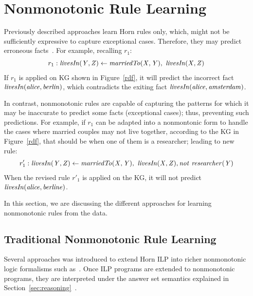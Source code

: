 \section{Nonmonotonic Rule Learning}\label{sec:nmrulelearn}

Previously described approaches learn Horn rules only, which, might not be sufficiently expressive to capture
exceptional cases. Therefore, they may predict erroneous facts~\cite{rumis}. For example, recalling $r_1$:
\[r_1 : \mathit{livesIn(Y,Z)} \leftarrow \mathit{marriedTo(X,Y)},\ \mathit{livesIn(X,Z)} \]
If $r_1$ is applied on KG shown in Figure~\ref{rdf}, it will predict the incorrect fact $\mathit{livesIn(alice,berlin)}$, which contradicts the exiting fact $\mathit{livesIn(alice, amsterdam)}$. 

In contrast, nonmonotonic rules are capable of capturing the patterns for which it may be inaccurate to predict some facts (\ie exceptional cases); thus, preventing such predictions. For example, if $r_1$ can be adapted into a nonmontonic form to handle the cases where married couples may not live together, according to the KG in Figure~\ref{rdf}, that should be when one of them is a researcher; leading to new rule:
\[r'_1 : \mathit{livesIn(Y,Z)} \leftarrow \mathit{marriedTo(X,Y)},\ \mathit{livesIn(X,Z)}, \mathit{not}~ \mathit{researcher(Y)}\]
When the revised rule $r'_1$ is applied on the KG, it will not predict $\mathit{livesIn(alice,berline)}$. 

In this section, we are discussing the different approaches for learning nonmonotonic rules from the data.


\subsection{Traditional Nonmonotonic Rule Learning}
Several approaches was introduced to extend Horn ILP into richer nonmonotonic logic formalisms such as~\cite{DBLP:conf/ijcai/InoueK97,DBLP:journals/tocl/Sakama05,R08,CorapiRL10,ILASP_system}. Once ILP programs are extended to nonmonotonic programs, they are interpreted under the answer set semantics explained in Section~\ref{sec:reasoning}~\cite{Shakerin2018}.


